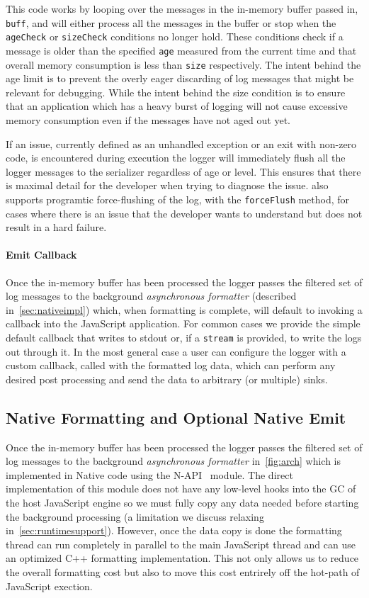 This code works by looping over the messages in the in-memory buffer passed in, 
\lstinline!buff!, and will either process all the messages in the buffer or 
stop when the \lstinline!ageCheck! or \lstinline!sizeCheck! conditions no longer 
hold. These conditions check if a message is older than the specified 
\lstinline!age! measured from the current time and that overall memory 
consumption is less than \lstinline!size! respectively. The intent behind the 
age limit is to prevent the overly eager discarding of log messages that might 
be relevant for debugging. While the intent behind the size condition is to ensure 
that an application which has a heavy burst of logging will not cause excessive 
memory consumption even if the messages have not aged out yet.

If an issue, currently defined as an unhandled exception or an exit with non-zero code, 
is encountered during execution the logger will immediately flush all the logger 
messages to the serializer regardless of age or level. This ensures that there is maximal 
detail for the developer when trying to diagnose the issue. \projn also supports 
programtic force-flushing of the log, with the \texttt{forceFlush} method, for cases where there 
is an issue that the developer wants to understand but does not result in a hard failure. 

\paragraph{Emit Callback}
\noindent
Once the in-memory buffer has been processed the logger passes the filtered set of 
log messages to the background \emph{asynchronous formatter} (described in~\autoref{sec:nativeimpl}) 
which, when formatting is complete, will default to invoking a callback into the 
JavaScript application. For common cases we provide the simple default callback that 
writes to stdout or, if a \texttt{stream} is provided, to write the logs out through 
it. In the most general case a user can configure the logger with a custom callback, 
called with the formatted log data, which can perform any desired post processing and 
send the data to arbitrary (or multiple) sinks.

\subsection{Native Formatting and Optional Native Emit}
\label{sec:nativeimpl}
Once the in-memory buffer has been processed the logger passes the filtered set of 
log messages to the background \emph{asynchronous formatter} in~\autoref{fig:arch} which 
is implemented in Native code using the N-API~\cite{NAPI} module. The direct 
implementation of this module does not have any low-level hooks into the GC of 
the host JavaScript engine so we must fully copy any data needed before starting 
the background processing (a limitation we discuss relaxing in~\autoref{sec:runtimesupport}). 
However, once the data copy is done the formatting thread can run completely in parallel 
to the main JavaScript thread and can use an optimized C++ formatting implementation. This 
not only allows us to reduce the overall formatting cost but also to move this cost 
entrirely off the hot-path of JavaScript exection.

